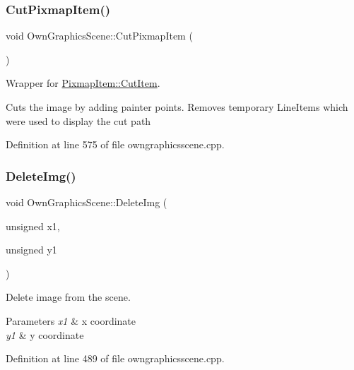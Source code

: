 \mbox{\label{classOwnGraphicsScene_a7e3d97c27cca1df796b75cc4a99e24cd}} 
\subsubsection{\texorpdfstring{Cut\+Pixmap\+Item()}{CutPixmapItem()}}
{\footnotesize\ttfamily void Own\+Graphics\+Scene\+::\+Cut\+Pixmap\+Item (\begin{DoxyParamCaption}{ }\end{DoxyParamCaption})}



Wrapper for \mbox{\hyperlink{classPixmapItem_a4a742318dce01d018da2f4b01790c210}{Pixmap\+Item\+::\+Cut\+Item}}. 

Cuts the image by adding painter points. Removes temporary Line\+Items which were used to display the cut path 

Definition at line 575 of file owngraphicsscene.\+cpp.

\mbox{\label{classOwnGraphicsScene_abda962c04f88920377d3bb23b30b9267}} 
\subsubsection{\texorpdfstring{Delete\+Img()}{DeleteImg()}}
{\footnotesize\ttfamily void Own\+Graphics\+Scene\+::\+Delete\+Img (\begin{DoxyParamCaption}\item[{unsigned}]{x1,  }\item[{unsigned}]{y1 }\end{DoxyParamCaption})}



Delete image from the scene. 


\begin{DoxyParams}{Parameters}
{\em x1} & x coordinate \\
\hline
{\em y1} & y coordinate \\
\hline
\end{DoxyParams}


Definition at line 489 of file owngraphicsscene.\+cpp.

